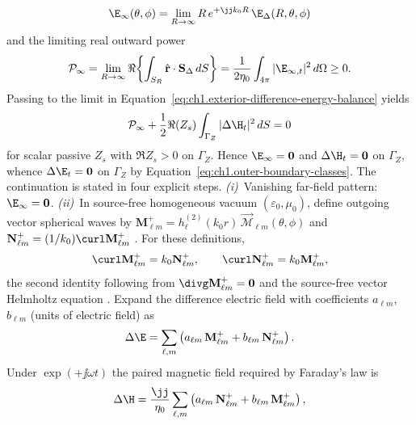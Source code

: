 \[
\E_\infty(\theta,\phi)=\lim_{R\to\infty}R\,e^{+\jj k_0 R}\,\E_\Delta(R,\theta,\phi)
\]
and the limiting real outward power
\[
\mathcal{P}_\infty=\lim_{R\to\infty}\Re\!\left\{\int_{S_R}\hat{\mathbf{r}}\cdot\mathbf{S}_\Delta\,dS\right\}
=\frac{1}{2\eta_0}\int_{4\pi}|\E_{\infty,t}|^{2}\,d\Omega\ge 0.
\]
Passing to the limit in Equation~\eqref{eq:ch1.exterior-difference-energy-balance} yields
\[
\mathcal{P}_\infty+\frac{1}{2}\Re(Z_s)\int_{\Gamma_Z}|\Delta\H_t|^{2}\,dS=0
\]
for scalar passive $Z_s$ with $\Re Z_s>0$ on $\Gamma_Z$. Hence $\E_\infty=\mathbf{0}$ and $\Delta\H_t=\mathbf{0}$ on $\Gamma_Z$, whence $\Delta\E_t=\mathbf{0}$ on $\Gamma_Z$ by Equation~\eqref{eq:ch1.outer-boundary-classes}. The continuation is stated in four explicit steps. \emph{(i)}~Vanishing far-field pattern: $\E_\infty=\mathbf{0}$. \emph{(ii)}~In source-free homogeneous vacuum $(\varepsilon_0,\mu_0)$, define outgoing vector spherical waves by $\mathbf M_{\ell m}^{+}=h_\ell^{(2)}(k_0 r)\,\vec{\mathcal{M}}_{\ell m}(\theta,\phi)$ and $\mathbf N_{\ell m}^{+}=(1/k_0)\curl\mathbf M_{\ell m}^{+}$ \cite{stratton1941,harrington2001}. For these definitions,
\begin{equation}
\label{eq:ch1.vsw-curl-identities}
\curl\mathbf M_{\ell m}^{+}=k_0\mathbf N_{\ell m}^{+},
\qquad
\curl\mathbf N_{\ell m}^{+}=k_0\mathbf M_{\ell m}^{+},
\end{equation}
the second identity following from $\divg\mathbf M_{\ell m}^{+}=\mathbf{0}$ and the source-free vector Helmholtz equation \cite{stratton1941,harrington2001}. Expand the difference electric field with coefficients $a_{\ell m}$, $b_{\ell m}$ (units of electric field) as
\begin{equation}
\label{eq:ch1.vsw-delta-E-expansion}
\Delta\E
=\sum_{\ell,m}\left(a_{\ell m}\,\mathbf M_{\ell m}^{+}
+b_{\ell m}\,\mathbf N_{\ell m}^{+}\right).
\end{equation}
Under $\exp(+\jj\omega t)$ the paired magnetic field required by Faraday's law is
\begin{equation}
\label{eq:ch1.vsw-delta-H-expansion}
\Delta\H
=\frac{\jj}{\eta_0}\sum_{\ell,m}\left(a_{\ell m}\,\mathbf N_{\ell m}^{+}
+b_{\ell m}\,\mathbf M_{\ell m}^{+}\right),
\end{equation}
